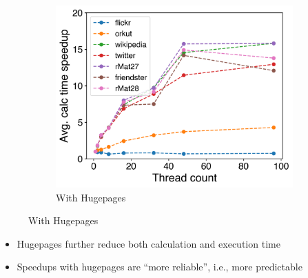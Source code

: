 \documentclass{meetings}
\begin{document}
\begin{figure}[h!]
\begin{subfigure}{0.3\linewidth}
\centering
\includegraphics[width=\linewidth]{../../plots/singleNodeSSSPGaloisHPThreads.png}
	\caption{With Hugepages}
\end{subfigure}
\end{figure}
\begin{itemize}
	\item Hugepages further reduce both calculation and execution time
	\item Speedups with hugepages are \enquote{more reliable}, i.e., more predictable
\end{itemize}
\end{document}
